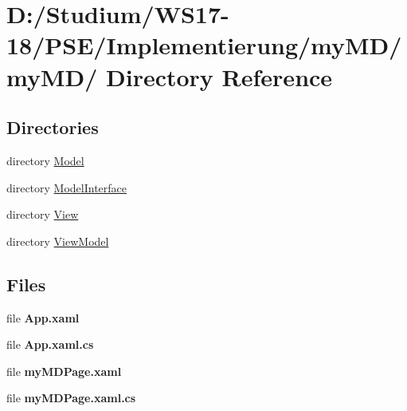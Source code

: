 \hypertarget{dir_D_3A_2FStudium_2FWS17_2D18_2FPSE_2FImplementierung_2FmyMD_2FmyMD_2F}{
\section{D:/Studium/WS17-18/PSE/Implementierung/my\-MD/my\-MD/ Directory Reference}
\label{dir_D_3A_2FStudium_2FWS17_2D18_2FPSE_2FImplementierung_2FmyMD_2FmyMD_2F}
}


\subsection*{Directories}
\begin{CompactItemize}
\item 
directory \hyperlink{dir_D_3A_2FStudium_2FWS17_2D18_2FPSE_2FImplementierung_2FmyMD_2FmyMD_2FModel_2F}{Model}
\item 
directory \hyperlink{dir_D_3A_2FStudium_2FWS17_2D18_2FPSE_2FImplementierung_2FmyMD_2FmyMD_2FModelInterface_2F}{Model\-Interface}
\item 
directory \hyperlink{dir_D_3A_2FStudium_2FWS17_2D18_2FPSE_2FImplementierung_2FmyMD_2FmyMD_2FView_2F}{View}
\item 
directory \hyperlink{dir_D_3A_2FStudium_2FWS17_2D18_2FPSE_2FImplementierung_2FmyMD_2FmyMD_2FViewModel_2F}{View\-Model}
\end{CompactItemize}
\subsection*{Files}
\begin{CompactItemize}
\item 
file {\bf App.xaml}
\item 
file {\bf App.xaml.cs}
\item 
file {\bf my\-MDPage.xaml}
\item 
file {\bf my\-MDPage.xaml.cs}
\end{CompactItemize}
